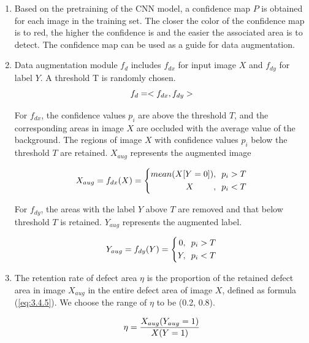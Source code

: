 \documentclass[sn-mathphys]{sn-jnl}%
\theoremstyle{thmstyleone}%
\theoremstyle{thmstyletwo}%
\theoremstyle{thmstylethree}%
\begin{document}
\begin{enumerate}[1)]
\item Based on the pretraining of the CNN model, a confidence map $P$ is obtained for each image in the training set. The closer the color of the confidence map is to red, the higher the confidence is and the easier the associated area is to detect. The confidence map can be used as a guide for data augmentation.

\item Data augmentation module $f_d$ includes $f_{dx}$ for input image $X$ and $f_{dy}$ for label $Y$. A threshold T is randomly chosen.
\begin{equation}
\centering
f_d = <f_{dx}, f_{dy}>
\end{equation}

For $f_{dx}$, the confidence values $p_i$ are above the threshold $T$, and the corresponding areas in image $X$ are occluded with the average value of the background. The regions of image $X$ with confidence values $p_i$ below the threshold $T$ are retained. $X_{aug}$ represents the augmented image

\begin{equation}
\centering
X_{aug} = f_{dx}(X) = \left\{
\begin{aligned}
mean(X[Y=0]), &~~p_i > T \\
X~~~~~~~,&~~p_i < T \\
\end{aligned}
\right.
\label{eq:fdx}
\end{equation}

For $f_{dy}$, the areas with the label $Y$ above $T$ are removed and that below threshold $T$ is retained. $Y_{aug}$ represents the augmented label.

\begin{equation}
\centering
Y_{aug} = f_{dy}(Y) = \left\{
\begin{aligned}
0, &~~p_i > T \\
Y, &~~p_i < T \\
\end{aligned}
\right.
\label{eq:fdy}
\end{equation}
\item The retention rate of defect area $\eta$ is the proportion of the retained defect area in image $X_{aug}$ in the entire defect area of image $X$, defined as formula (\ref{eq:3.4.5}). We choose the range of $\eta$ to be (0.2, 0.8).

\begin{equation}
\centering
\eta = \frac{X_{aug} (Y_{aug} = 1)}{X (Y = 1)}
\label{eq:3.4.5}
\end{equation}


\end{enumerate}
\end{document}
